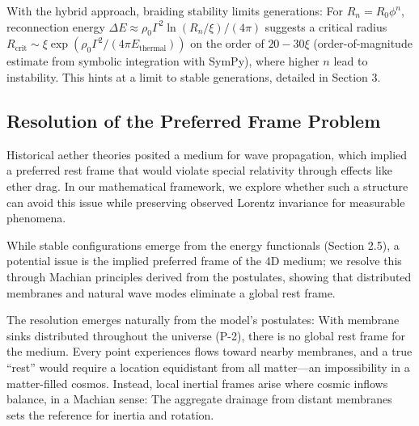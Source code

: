 With the hybrid approach, braiding stability limits generations: For $R_n = R_0 \phi^n$, reconnection energy $\Delta E \approx \rho_0 \Gamma^2 \ln(R_n / \xi) / (4\pi)$ suggests a critical radius $R_{\text{crit}} \sim \xi \exp(\rho_0 \Gamma^2 / (4\pi E_{\text{thermal}}))$ on the order of $20-30\xi$ (order-of-magnitude estimate from symbolic integration with SymPy), where higher $n$ lead to instability. This hints at a limit to stable generations, detailed in Section 3.

\medskip
\noindent
{}
\medskip

\subsection{Resolution of the Preferred Frame Problem}

Historical aether theories posited a medium for wave propagation, which implied a preferred rest frame that would violate special relativity through effects like ether drag. In our mathematical framework, we explore whether such a structure can avoid this issue while preserving observed Lorentz invariance for measurable phenomena.

While stable configurations emerge from the energy functionals (Section 2.5), a potential issue is the implied preferred frame of the 4D medium; we resolve this through Machian principles derived from the postulates, showing that distributed membranes and natural wave modes eliminate a global rest frame.

The resolution emerges naturally from the model's postulates: With membrane sinks distributed throughout the universe (P-2), there is no global rest frame for the medium. Every point experiences flows toward nearby membranes, and a true ``rest'' would require a location equidistant from all matter---an impossibility in a matter-filled cosmos. Instead, local inertial frames arise where cosmic inflows balance, in a Machian sense: The aggregate drainage from distant membranes sets the reference for inertia and rotation.

